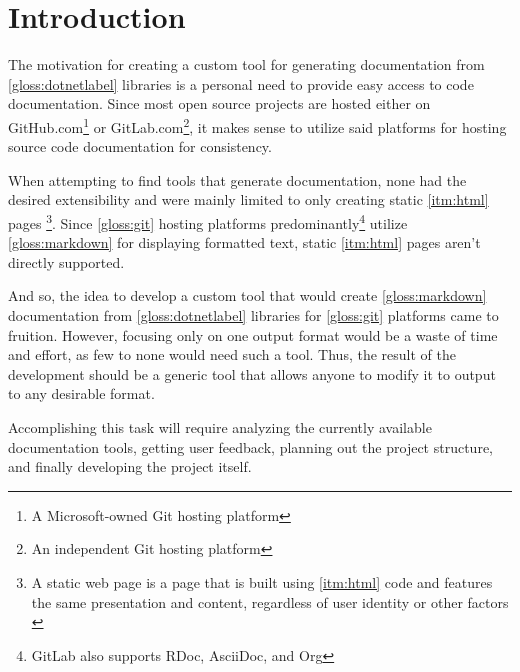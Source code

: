 \chapter*{Introduction}

The motivation for creating a custom tool for generating documentation from \ref{gloss:dotnetlabel} libraries is a personal need to provide easy access to code documentation. Since most open source projects are hosted either on GitHub.com\footnote{A Microsoft-owned Git hosting platform} or GitLab.com\footnote{An independent Git hosting platform}, it makes sense to utilize said platforms for hosting source code documentation for consistency.

When attempting to find tools that generate documentation, none had the desired extensibility and were mainly limited to only creating static \ref{itm:html} pages
\footnote{A static web page is a page that is built using \ref{itm:html} code and features the same presentation and content, regardless of user identity or other factors \cite{techopedia_what_2017}}.
Since \ref{gloss:git} hosting platforms predominantly\footnote{GitLab also supports RDoc, AsciiDoc, and Org} utilize \ref{gloss:markdown} for displaying formatted text, static \ref{itm:html} pages aren't directly supported.

And so, the idea to develop a custom tool that would create \ref{gloss:markdown} documentation from \ref{gloss:dotnetlabel} libraries for \ref{gloss:git} platforms came to fruition. However, focusing only on one output format would be a waste of time and effort, as few to none would need such a tool. Thus, the result of the development should be a generic tool that allows anyone to modify it to output to any desirable format.

Accomplishing this task will require analyzing the currently available documentation tools, getting user feedback, planning out the project structure, and finally developing the project itself.


